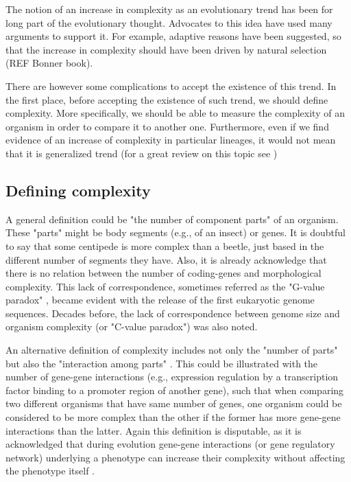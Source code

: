 The notion of an increase in complexity as an evolutionary trend has been for long part of the evolutionary thought. Advocates to this idea have used many arguments to support it. For example, adaptive reasons have been suggested, so that the increase in complexity should have been driven by natural selection (REF Bonner book).

There are however some complications to accept the existence of this trend. In the first place, before accepting the existence of such trend, we should define complexity.
More specifically, we should be able to measure the complexity of an organism in order to compare it to another one.
Furthermore, even if we find evidence of an increase of complexity in particular lineages, it would not mean that it is generalized trend (for a great review on this topic see \citep{McShea1996})


\subsection{Defining complexity}
A general definition could be "the number of component parts" of an organism\citep{McShea1996,Arthur2010}.
These "parts" might be body segments (e.g., of an insect) or genes.
It is doubtful to say that some centipede is more complex than a beetle, just based in the different number of segments they have.
Also, it is already acknowledge that there is no relation between the number of coding-genes and morphological complexity.
This lack of correspondence, sometimes referred as the "G-value paradox"
	\citep{Hahn2002},
became evident with the release of the first eukaryotic genome sequences.
Decades before, the lack of correspondence between genome size and organism complexity (or "C-value paradox") was also noted.

An alternative definition of complexity includes not only the "number of parts" but also the "interaction among parts" 
	\citep{McShea1996,Arthur2010}.
This could be illustrated with the number of gene-gene interactions (e.g., expression regulation by a transcription factor binding to a promoter region of another gene),
such that when comparing two different organisms that have same number of genes, 
one organism could be considered to be more complex than the other if the former has more gene-gene interactions than the latter.
Again this definition is disputable, as it is acknowledged that during evolution gene-gene interactions (or gene regulatory network) underlying a phenotype
can increase their complexity without affecting the phenotype itself
	\citep{Muller1999,True2001,Salazar-Ciudad2009}.

